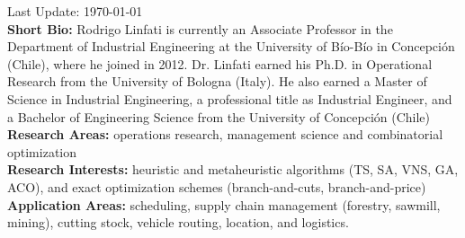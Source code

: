 \makecvtitle
Last Update: \today
~ \\
\textbf{Short Bio:} Rodrigo Linfati is currently an Associate Professor in the Department of Industrial Engineering at the University of B\'io-B\'io in Concepci\'on (Chile), where he joined in 2012. Dr. Linfati earned his Ph.D. in Operational Research from the University of Bologna (Italy). He also earned a Master of Science in Industrial Engineering, a professional title as Industrial Engineer, and a Bachelor of Engineering Science from the University of Concepci\'on (Chile)
~ \\
\textbf{Research Areas:} operations research, management science and combinatorial optimization
~ \\
\textbf{Research Interests:} heuristic and metaheuristic algorithms (TS, SA, VNS, GA, ACO), and exact optimization schemes (branch-and-cuts, branch-and-price)
~ \\
\textbf{Application Areas:} scheduling, supply chain management (forestry, sawmill, mining), cutting stock, vehicle routing, location, and logistics.

\clearpage